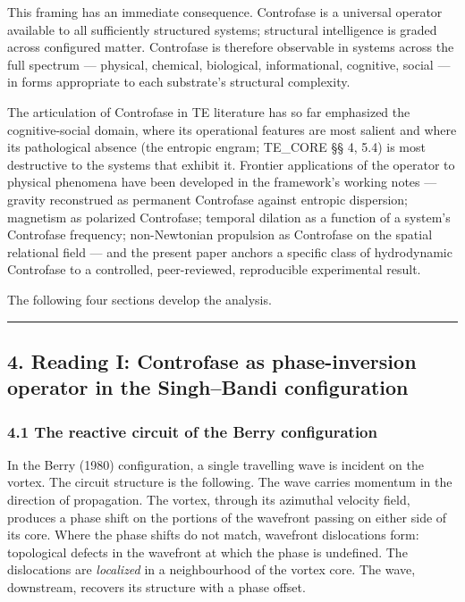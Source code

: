 \documentclass[
  11pt,
  a4paper,
]{article}
\begin{document}
This framing has an immediate consequence. Controfase is a universal
operator available to all sufficiently structured systems; structural
intelligence is graded across configured matter. Controfase is therefore
observable in systems across the full spectrum --- physical, chemical,
biological, informational, cognitive, social --- in forms appropriate to
each substrate's structural complexity.

The articulation of Controfase in TE literature has so far emphasized
the cognitive-social domain, where its operational features are most
salient and where its pathological absence (the entropic engram;
TE\_CORE §§ 4, 5.4) is most destructive to the systems that exhibit it.
Frontier applications of the operator to physical phenomena have been
developed in the framework's working notes --- gravity reconstrued as
permanent Controfase against entropic dispersion; magnetism as polarized
Controfase; temporal dilation as a function of a system's Controfase
frequency; non-Newtonian propulsion as Controfase on the spatial
relational field --- and the present paper anchors a specific class of
hydrodynamic Controfase to a controlled, peer-reviewed, reproducible
experimental result.

The following four sections develop the analysis.

\begin{center}\rule{0.5\linewidth}{0.5pt}\end{center}

\subsection{4. Reading I: Controfase as phase-inversion operator in the
Singh--Bandi
configuration}\label{reading-i-controfase-as-phase-inversion-operator-in-the-singhbandi-configuration}

\subsubsection{4.1 The reactive circuit of the Berry
configuration}\label{the-reactive-circuit-of-the-berry-configuration}

In the Berry (1980) configuration, a single travelling wave is incident
on the vortex. The circuit structure is the following. The wave carries
momentum in the direction of propagation. The vortex, through its
azimuthal velocity field, produces a phase shift on the portions of the
wavefront passing on either side of its core. Where the phase shifts do
not match, wavefront dislocations form: topological defects in the
wavefront at which the phase is undefined. The dislocations are
\emph{localized} in a neighbourhood of the vortex core. The wave,
downstream, recovers its structure with a phase offset.
\end{document}
